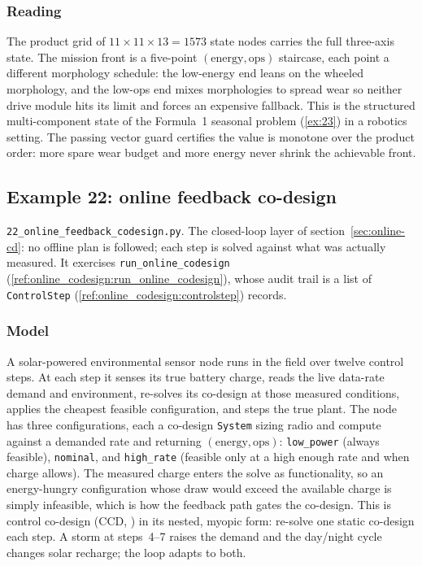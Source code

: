 \documentclass[11pt,a4paper]{article}
\begin{document}
\subsubsection*{Reading}
The product grid of $11\times 11\times 13 = 1573$ state nodes carries the
full three-axis state. The mission front is a five-point
$(\text{energy},\text{ops})$ staircase, each point a different morphology
schedule: the low-energy end leans on the wheeled morphology, and the
low-ops end mixes morphologies to spread wear so neither drive module hits
its limit and forces an expensive fallback. This is the structured
multi-component state of the Formula~1 seasonal problem
(\ref{ex:23}) in a robotics setting. The passing vector guard certifies
the value is monotone over the product order: more spare wear budget and
more energy never shrink the achievable front.

\subsection{Example 22: online feedback co-design}
\label{ex:22}

\texttt{22\_online\_feedback\_codesign.py}. The closed-loop layer of
section~\ref{sec:online-cd}: no offline plan is followed; each step is
solved against what was actually measured. It exercises
\texttt{run\_online\_codesign} (\ref{ref:online_codesign:run_online_codesign}),
whose audit trail is a list of \texttt{ControlStep}
(\ref{ref:online_codesign:controlstep}) records.

\subsubsection*{Model}
A solar-powered environmental sensor node runs in the field over twelve
control steps. At each step it senses its true battery charge, reads the
live data-rate demand and environment, re-solves its co-design at those
measured conditions, applies the cheapest feasible configuration, and
steps the true plant. The node has three configurations, each a co-design
\texttt{System} sizing radio and compute against a demanded rate and
returning $(\text{energy},\text{ops})$: \texttt{low\_power} (always
feasible), \texttt{nominal}, and \texttt{high\_rate} (feasible only at a
high enough rate and when charge allows). The measured charge enters the
solve as functionality, so an energy-hungry configuration whose draw would
exceed the available charge is simply infeasible, which is how the feedback
path gates the co-design. This is control co-design
(CCD, \citealp{garciasanz2019ccd}) in its
nested, myopic form: re-solve one static co-design each step. A storm at
steps~4--7 raises the demand and the day/night cycle changes solar
recharge; the loop adapts to both.
\end{document}
